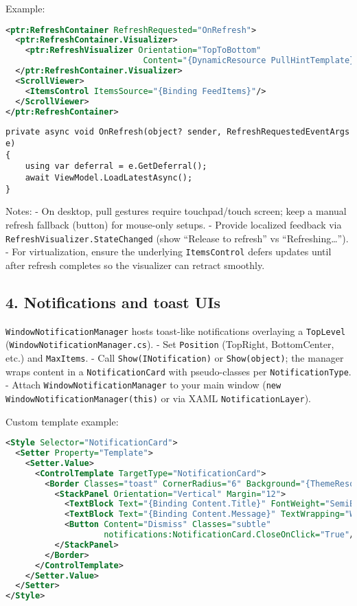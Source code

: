 Example:

\begin{lstlisting}[language=XML]
<ptr:RefreshContainer RefreshRequested="OnRefresh">
  <ptr:RefreshContainer.Visualizer>
    <ptr:RefreshVisualizer Orientation="TopToBottom"
                            Content="{DynamicResource PullHintTemplate}"/>
  </ptr:RefreshContainer.Visualizer>
  <ScrollViewer>
    <ItemsControl ItemsSource="{Binding FeedItems}"/>
  </ScrollViewer>
</ptr:RefreshContainer>
\end{lstlisting}

\begin{lstlisting}
private async void OnRefresh(object? sender, RefreshRequestedEventArgs e)
{
    using var deferral = e.GetDeferral();
    await ViewModel.LoadLatestAsync();
}
\end{lstlisting}

Notes: - On desktop, pull gestures require touchpad/touch screen; keep a
manual refresh fallback (button) for mouse-only setups. - Provide
localized feedback via
\passthrough{\lstinline!RefreshVisualizer.StateChanged!} (show ``Release
to refresh'' vs ``Refreshing\ldots{}''). - For virtualization, ensure
the underlying \passthrough{\lstinline!ItemsControl!} defers updates
until after refresh completes so the visualizer can retract smoothly.

\subsection{4. Notifications and toast
UIs}\label{notifications-and-toast-uis}

\passthrough{\lstinline!WindowNotificationManager!} hosts toast-like
notifications overlaying a \passthrough{\lstinline!TopLevel!}
(\passthrough{\lstinline!WindowNotificationManager.cs!}). - Set
\passthrough{\lstinline!Position!} (TopRight, BottomCenter, etc.) and
\passthrough{\lstinline!MaxItems!}. - Call
\passthrough{\lstinline!Show(INotification)!} or
\passthrough{\lstinline!Show(object)!}; the manager wraps content in a
\passthrough{\lstinline!NotificationCard!} with pseudo-classes per
\passthrough{\lstinline!NotificationType!}. - Attach
\passthrough{\lstinline!WindowNotificationManager!} to your main window
(\passthrough{\lstinline!new WindowNotificationManager(this)!} or via
XAML \passthrough{\lstinline!NotificationLayer!}).

Custom template example:

\begin{lstlisting}[language=XML]
<Style Selector="NotificationCard">
  <Setter Property="Template">
    <Setter.Value>
      <ControlTemplate TargetType="NotificationCard">
        <Border Classes="toast" CornerRadius="6" Background="{ThemeResource SurfaceBrush}">
          <StackPanel Orientation="Vertical" Margin="12">
            <TextBlock Text="{Binding Content.Title}" FontWeight="SemiBold"/>
            <TextBlock Text="{Binding Content.Message}" TextWrapping="Wrap"/>
            <Button Content="Dismiss" Classes="subtle"
                    notifications:NotificationCard.CloseOnClick="True"/>
          </StackPanel>
        </Border>
      </ControlTemplate>
    </Setter.Value>
  </Setter>
</Style>
\end{lstlisting}


